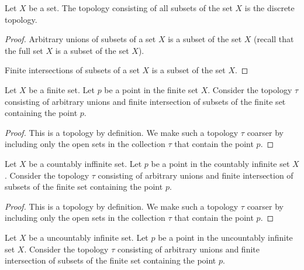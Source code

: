 \begin{example}
    \label{example-discrete}
    Let $X$ be a set.
    The topology consisting of all subsets of the set $X$ is the discrete topology.
\end{example}

\begin{proof}
    Arbitrary unions of subsets of a set $X$ is a subset of the set $X$ (recall that the full set $X$ is a subset of the set $X$).

    Finite intersections of subsets of a set $X$ is a subset of the set $X$.
\end{proof}

\begin{example}
    \label{example-finite-particular-point}
    Let $X$ be a finite set.
    Let $p$ be a point in the finite set $X$.
    Consider the topology $\tau$ consisting of arbitrary unions and finite intersection of subsets of the finite set containing the point $p$.
\end{example}

\begin{proof}
    This is a topology by definition.
    We make such a topology $\tau$ coarser by including only the open sets in the collection $\tau$ that contain the point $p$.
\end{proof}

\begin{example}
    \label{example-countably-infinite-particular-point}
    Let $X$ be a countably inffinite set.
    Let $p$ be a point in the countably infinite set $X$.
    Consider the topology $\tau$ consisting of arbitrary unions and finite intersection of subsets of the finite set containing the point $p$.
\end{example}

\begin{proof}
    This is a topology by definition.
    We make such a topology $\tau$ coarser by including only the open sets in the collection $\tau$ that contain the point $p$.
\end{proof}

\begin{example}
    \label{example-uncountably-infinite-particular-point}
    Let $X$ be a uncountably infinite set.
    Let $p$ be a point in the uncountably infinite set $X$.
    Consider the topology $\tau$ consisting of arbitrary unions and finite intersection of subsets of the finite set containing the point $p$.
\end{example}

